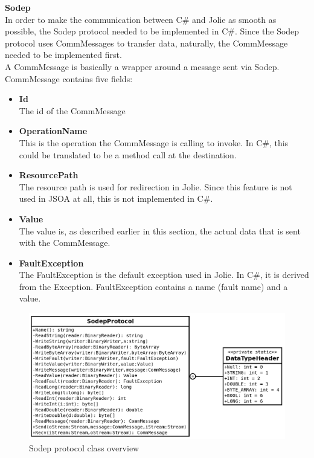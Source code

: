 \documentclass[12pt,a4paper]{article}
\begin{document}
\textbf{Sodep} \\
In order to make the communication between C\# and Jolie as smooth as possible, the Sodep protocol needed to be implemented in C\#. Since the Sodep protocol uses CommMessages to transfer data, naturally, the CommMessage needed to be implemented first.\\
A CommMessage is basically a wrapper around a message sent via Sodep. CommMessage contains five fields:
\begin{itemize}
\item\textbf{Id}\\
The id of the CommMessage
\item\textbf{OperationName}\\
This is the operation the CommMessage is calling to invoke. In C\#, this could be translated to be a method call at the destination.
\item\textbf{ResourcePath}\\
The resource path is used for redirection in Jolie\cite{jolie_redirection}. Since this feature is not used in JSOA at all, this is not implemented in C\#.
\item\textbf{Value}\\
The value is, as described earlier in this section, the actual data that is sent with the CommMessage.
\item\textbf{FaultException}\\
The FaultException is the default exception used in Jolie. In C\#, it is derived from the Exception\cite{cSharp_exception}. FaultException contains a name (fault name) and a value.
\end{itemize}

\newpage
\begin{figure}[h!]
  \centering
    \includegraphics[width=1.0\textwidth]{../figures/sodepClassDiagram.png}
  \caption{Sodep protocol class overview}
  \label{fig:sodepClassDiagrams}
\end{figure}
\end{document}
